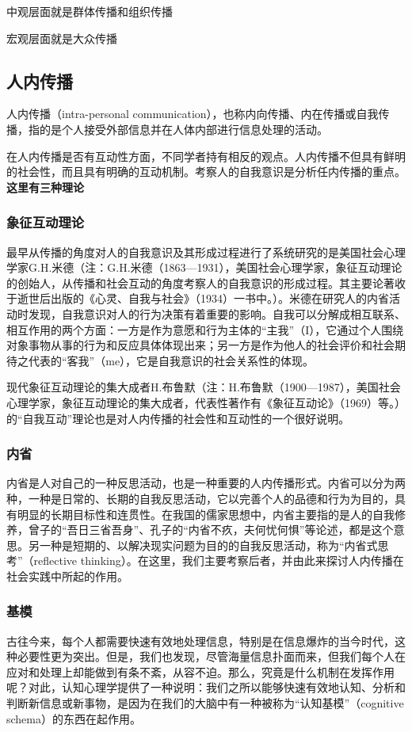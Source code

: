 \documentclass[UTF8,12pt]{ctexart}
\numberwithin{equation}{section} %
\numberwithin{figure}{section}
\numberwithin{table}{section}
\begin{document}
	中观层面就是群体传播和组织传播
	
	宏观层面就是大众传播
	
	\subsection{人内传播}
	人内传播（intra-personal communication），也称内向传播、内在传播或自我传播，指的是个人接受外部信息并在人体内部进行信息处理的活动。
	
	在人内传播是否有互动性方面，不同学者持有相反的观点。人内传播不但具有鲜明的社会性，而且具有明确的互动机制。考察人的自我意识是分析任内传播的重点。\textbf{这里有三种理论}
	
	\subsubsection{象征互动理论}
	最早从传播的角度对人的自我意识及其形成过程进行了系统研究的是美国社会心理学家G.H.米德（注：G.H.米德（1863—1931），美国社会心理学家，象征互动理论的创始人，从传播和社会互动的角度考察人的自我意识的形成过程。其主要论著收于逝世后出版的《心灵、自我与社会》（1934）一书中。）。米德在研究人的内省活动时发现，自我意识对人的行为决策有着重要的影响。自我可以分解成相互联系、相互作用的两个方面：一方是作为意愿和行为主体的“主我”（I），它通过个人围绕对象事物从事的行为和反应具体体现出来；另一方是作为他人的社会评价和社会期待之代表的“客我”（me），它是自我意识的社会关系性的体现。
	
	现代象征互动理论的集大成者H.布鲁默（注：H.布鲁默（1900—1987），美国社会心理学家，象征互动理论的集大成者，代表性著作有《象征互动论》（1969）等。）的“自我互动”理论也是对人内传播的社会性和互动性的一个很好说明。
	
	\subsubsection{内省}
	内省是人对自己的一种反思活动，也是一种重要的人内传播形式。内省可以分为两种，一种是日常的、长期的自我反思活动，它以完善个人的品德和行为为目的，具有明显的长期目标性和连贯性。在我国的儒家思想中，内省主要指的是人的自我修养，曾子的“吾日三省吾身”、孔子的“内省不疚，夫何忧何惧”等论述，都是这个意思。另一种是短期的、以解决现实问题为目的的自我反思活动，称为“内省式思考”（reflective thinking）。在这里，我们主要考察后者，并由此来探讨人内传播在社会实践中所起的作用。
	
	\subsubsection{基模}
	古往今来，每个人都需要快速有效地处理信息，特别是在信息爆炸的当今时代，这种必要性更为突出。但是，我们也发现，尽管海量信息扑面而来，但我们每个人在应对和处理上却能做到有条不紊，从容不迫。那么，究竟是什么机制在发挥作用呢？对此，认知心理学提供了一种说明：我们之所以能够快速有效地认知、分析和判断新信息或新事物，是因为在我们的大脑中有一种被称为“认知基模”（cognitive schema）的东西在起作用。
	
\end{document}
